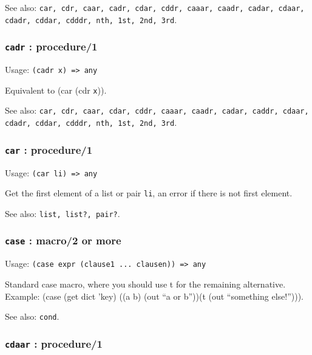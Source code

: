 \documentclass[
]{article}
\newcommand{\passthrough}[1]{#1}
\begin{document}
See also:
\passthrough{\lstinline!car, cdr, caar, cadr, cdar, cddr, caaar, caadr, cadar, cdaar, cdadr, cddar, cdddr, nth, 1st, 2nd, 3rd!}.

\hypertarget{cadr-procedure1}{%
\subsubsection{\texorpdfstring{\texttt{cadr} :
procedure/1}{cadr : procedure/1}}\label{cadr-procedure1}}

Usage: \passthrough{\lstinline!(cadr x) => any!}

Equivalent to (car (cdr \passthrough{\lstinline!x!})).

See also:
\passthrough{\lstinline!car, cdr, caar, cdar, cddr, caaar, caadr, cadar, caddr, cdaar, cdadr, cddar, cdddr, nth, 1st, 2nd, 3rd!}.

\hypertarget{car-procedure1}{%
\subsubsection{\texorpdfstring{\texttt{car} :
procedure/1}{car : procedure/1}}\label{car-procedure1}}

Usage: \passthrough{\lstinline!(car li) => any!}

Get the first element of a list or pair \passthrough{\lstinline!li!}, an
error if there is not first element.

See also: \passthrough{\lstinline!list, list?, pair?!}.

\hypertarget{case-macro2-or-more}{%
\subsubsection{\texorpdfstring{\texttt{case} : macro/2 or
more}{case : macro/2 or more}}\label{case-macro2-or-more}}

Usage:
\passthrough{\lstinline!(case expr (clause1 ... clausen)) => any!}

Standard case macro, where you should use t for the remaining
alternative. Example: (case (get dict 'key) ((a b) (out ``a or b''))(t
(out ``something else!''))).

See also: \passthrough{\lstinline!cond!}.

\hypertarget{cdaar-procedure1}{%
\subsubsection{\texorpdfstring{\texttt{cdaar} :
procedure/1}{cdaar : procedure/1}}\label{cdaar-procedure1}}
\end{document}
